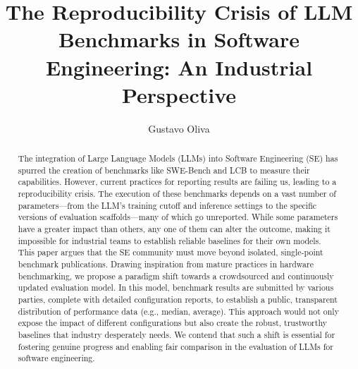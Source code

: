 \documentclass[sigconf,review]{acmart}
\begin{document}
\title{The Reproducibility Crisis of LLM Benchmarks in Software Engineering: An Industrial Perspective}

\author{Gustavo Oliva}

\renewcommand{\shortauthors}{Gustavo et al.}

\begin{abstract}
The integration of Large Language Models (LLMs) into Software Engineering (SE) has spurred the creation of benchmarks like SWE-Bench and LCB to measure their capabilities. However, current practices for reporting results are failing us, leading to a reproducibility crisis. The execution of these benchmarks depends on a vast number of parameters—from the LLM's training cutoff and inference settings to the specific versions of evaluation scaffolds—many of which go unreported. While some parameters have a greater impact than others, any one of them can alter the outcome, making it impossible for industrial teams to establish reliable baselines for their own models. This paper argues that the SE community must move beyond isolated, single-point benchmark publications. Drawing inspiration from mature practices in hardware benchmarking, we propose a paradigm shift towards a crowdsourced and continuously updated evaluation model. In this model, benchmark results are submitted by various parties, complete with detailed configuration reports, to establish a public, transparent distribution of performance data (e.g., median, average). This approach would not only expose the impact of different configurations but also create the robust, trustworthy baselines that industry desperately needs. We contend that such a shift is essential for fostering genuine progress and enabling fair comparison in the evaluation of LLMs for software engineering.
\end{abstract}
\end{document}
